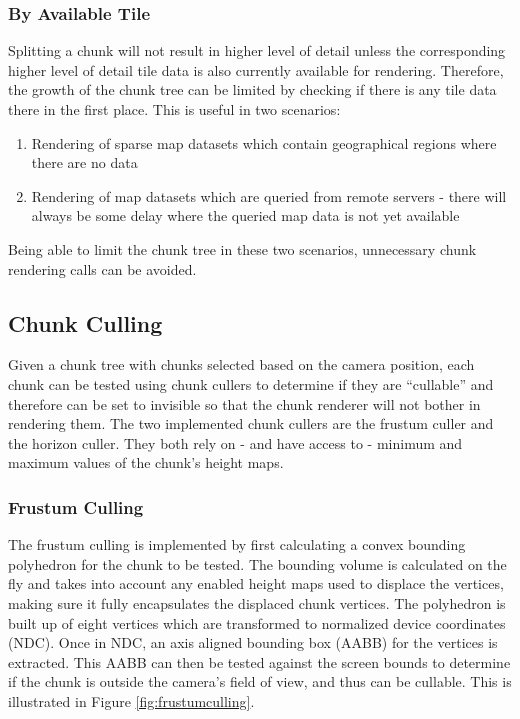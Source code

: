 \subsubsection{By Available Tile}
Splitting a chunk will not result in higher level of detail unless the corresponding higher level of detail tile data is also currently available for rendering. Therefore, the growth of the chunk tree can be limited by checking if there is any tile data there in the first place. This is useful in two scenarios:

\begin{enumerate}
\item Rendering of sparse map datasets which contain geographical regions where there are no data
\item Rendering of map datasets which are queried from remote servers - there will always be some delay where the queried map data is not yet available
\end{enumerate}

Being able to limit the chunk tree in these two scenarios, unnecessary chunk rendering calls can be avoided.

\subsection{Chunk Culling}
Given a chunk tree with chunks selected based on the camera position, each chunk can be tested using chunk cullers to determine if they are ``cullable'' and therefore can be set to invisible so that the chunk renderer will not bother in rendering them. The two implemented chunk cullers are the frustum culler and the horizon culler. They both rely on - and have access to - minimum and maximum values of the chunk's height maps. 

\subsubsection{Frustum Culling}
The frustum culling is implemented by first calculating a convex bounding polyhedron for the chunk to be tested. The bounding volume is calculated on the fly and takes into account any enabled height maps used to displace the vertices, making sure it fully encapsulates the displaced chunk vertices. The polyhedron is built up of eight vertices which are transformed to normalized device coordinates (NDC). Once in NDC, an axis aligned bounding box (AABB) for the vertices is extracted. This AABB can then be tested against the screen bounds to determine if the chunk is outside the camera's field of view, and thus can be cullable. This is illustrated in Figure \ref{fig:frustumculling}.

